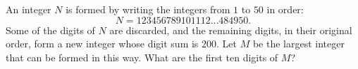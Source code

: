An integer $N$ is formed by writing the integers from $1$ to $50$ in order:
\[
N=123456789101112\ldots484950 .
\]
Some of the digits of $N$ are discarded, and the remaining digits, in their original order, form a new integer whose digit sum is $200$. Let $M$ be the largest integer that can be formed in this way. What are the first ten digits of $M$?

